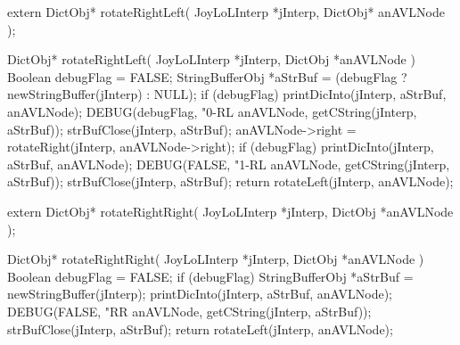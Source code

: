 \startCHeader
extern DictObj* rotateRightLeft(
  JoyLoLInterp *jInterp,
  DictObj* anAVLNode
);
\stopCHeader

\startCCode
DictObj* rotateRightLeft(
  JoyLoLInterp *jInterp,
  DictObj      *anAVLNode
) {
  Boolean debugFlag = FALSE;
  StringBufferObj *aStrBuf =
    (debugFlag ? newStringBuffer(jInterp) : NULL);
  if (debugFlag) {
    printDicInto(jInterp, aStrBuf, anAVLNode);
    DEBUG(debugFlag, "0-RL %
      anAVLNode, getCString(jInterp, aStrBuf));
    strBufClose(jInterp, aStrBuf);
  }
  anAVLNode->right = rotateRight(jInterp, anAVLNode->right);
  if (debugFlag) {
    printDicInto(jInterp, aStrBuf, anAVLNode);
    DEBUG(FALSE, "1-RL %
      anAVLNode, getCString(jInterp, aStrBuf));
    strBufClose(jInterp, aStrBuf);
  }
  return rotateLeft(jInterp, anAVLNode);
}
\stopCCode

\startCHeader
extern DictObj* rotateRightRight(
  JoyLoLInterp *jInterp,
  DictObj      *anAVLNode
);
\stopCHeader

\startCCode
DictObj* rotateRightRight(
  JoyLoLInterp *jInterp,
  DictObj      *anAVLNode
) {
  Boolean debugFlag = FALSE;
  if (debugFlag) {
    StringBufferObj *aStrBuf = newStringBuffer(jInterp);
    printDicInto(jInterp, aStrBuf, anAVLNode);
    DEBUG(FALSE, "RR %
      anAVLNode, getCString(jInterp, aStrBuf));
    strBufClose(jInterp, aStrBuf);
  }
  return rotateLeft(jInterp, anAVLNode);
}
\stopCCode

